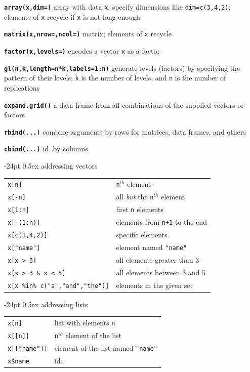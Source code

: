 \documentclass[10pt,landscape]{article}
\makeatletter
\renewcommand\section{\@startsection{section}{1}{0mm}%
                                     {-24pt}%
                                     {0.5ex}%
                                {\color{blue}\normalfont\large\bfseries}}
\newcommand{\code}{\texttt}
\newcommand{\bcode}[1]{\texttt{\textbf{#1}}}
\makeatother
\begin{document}
\begin{multicols*}{3}
\bcode{array(x,dim=)} array with data \code{x}; specify
dimensions like \code{dim=c(3,4,2)}; elements of \code{x} recycle if \code{x}
is not long enough

\bcode{matrix(x,nrow=,ncol=)} matrix; elements of \code{x} recycle

\bcode{factor(x,levels=)} encodes a vector \code{x} as a factor

\bcode{gl(n,k,length=n*k,labels=1:n)} generate levels (factors) by specifying
the pattern of their levels; \code{k} is the number of levels, and \code{n} is the
number of replications

\bcode{expand.grid()} a data frame from all combinations of the supplied vectors
     or factors

\bcode{rbind(...)} combine arguments by rows for matrices, data frames, and
others

\bcode{cbind(...)} id. by columns


\section{addressing vectors}

\begin{tabular}{@{}l@{\ }l}
\code{x[n]} & \code{n}$^{th}$ element\\
\code{x[-n]} & all \emph{but} the \code{n}$^{th}$ element\\
\code{x[1:n]} & first \code{n} elements\\
\code{x[-(1:n)]} & elements from \code{n+1} to the end\\
\code{x[c(1,4,2)]} & specific elements\\
\code{x["name"]} & element named \code{"name"}\\
\code{x[x > 3]} & all elements greater than 3\\
\code{x[x > 3 \& x < 5]} & all elements between 3 and 5\\
\code{x[x \%in\% c("a","and","the")]} & elements in the given set\\
\end{tabular}

\section{addressing lists}
\samepage\begin{tabular}{@{}l@{\ }l}
\code{x[n]} & list with elements \code{n}\\
\code{x[[n]]} & \code{n}$^{th}$ element of the list\\
\code{x[["name"]]} & element of the list named \code{"name"}\\
\code{x\$name} & id.\\
\end{tabular}


\end{multicols*}
\end{document}
